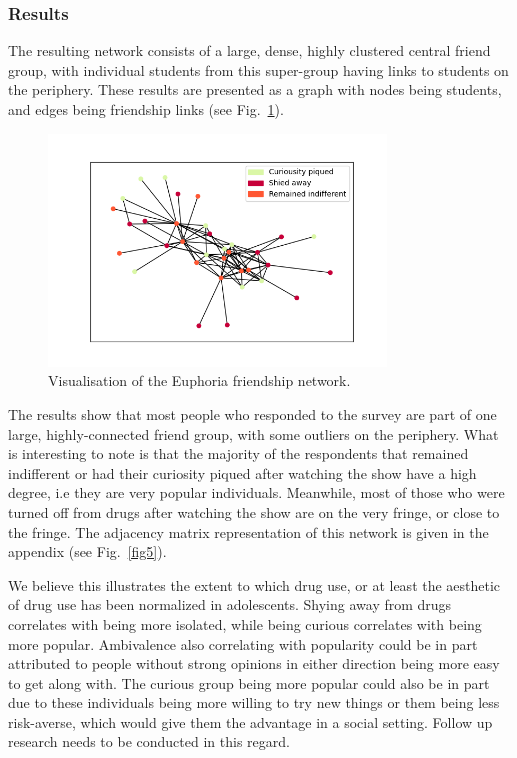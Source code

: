 \documentclass[runningheads]{llncs}
\begin{document}
\subsubsection{Results}
The resulting network consists of a large, dense, highly clustered central friend group, with individual students from this super-group having links to students on the periphery. These results are presented as a graph with nodes being students, and edges being friendship links (see Fig.~\ref{fig3}).

\begin{figure}
\begin{center}
\includegraphics[width=0.8\textwidth]{Project/fig3.png}
\caption{Visualisation of the Euphoria friendship network.} \label{fig3}
\end{center}
\end{figure}
\FloatBarrier
The results show that most people who responded to the survey are part of one large, highly-connected friend group, with some outliers on the periphery. What is interesting to note is that the majority of the respondents that remained indifferent or had their curiosity piqued after watching the show have a high degree, i.e they are very popular individuals. Meanwhile, most of those who were turned off from drugs after watching the show are on the very fringe, or close to the fringe. The adjacency matrix representation of this network is given in the appendix (see Fig.~\ref{fig5}).

We believe this illustrates the extent to which drug use, or at least the aesthetic of drug use has been normalized in adolescents. Shying away from drugs correlates with being more isolated, while being curious correlates with being more popular. Ambivalence also correlating with popularity could be in part attributed to people without strong opinions in either direction being more easy to get along with. The curious group being more popular could also be in part due to these individuals being more willing to try new things or them being less risk-averse, which would give them the advantage in a social setting. Follow up research needs to be conducted in this regard. 
\end{document}
